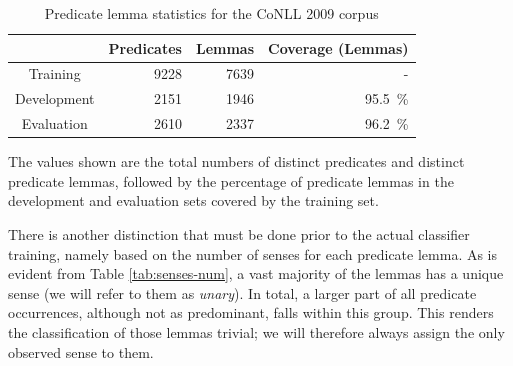 \documentclass[12pt,notitlepage,a4paper]{report}
\begin{document}
\begin{table}[htbp]\footnotesize
\caption{Predicate lemma statistics for the CoNLL 2009 corpus}\label{tab:lemma-stats}
\begin{center}
\begin{tabular}{|c|rrr|}\hline
& \bf Predicates  &\bf Lemmas & \bf Coverage (Lemmas) \\\hline
Training & 9228 & 7639 &  - \\
Development & 2151 & 1946 & 95.5~\% \\
Evaluation &  2610 & 2337 & 96.2~\%  \\\hline
\end{tabular}
\end{center}
The values shown are the total numbers of distinct predicates and distinct predicate lemmas, followed by the percentage of predicate lemmas in the development and evaluation sets covered by the training set.
\end{table}

There is another distinction that must be done prior to the actual classifier training, namely based on the number of senses for each predicate lemma. As is evident from Table \ref{tab:senses-num}, a vast majority of the lemmas has a unique sense (we will refer to them as \emph{unary}). In total, a larger part of all predicate occurrences, although not as predominant, falls within this group. This renders the classification of those lemmas trivial; we will therefore always assign the only observed sense to them.
\end{document}

